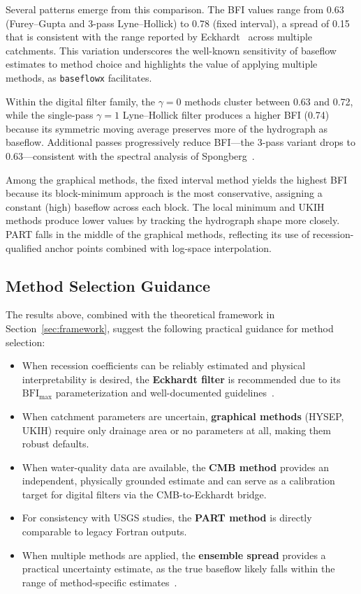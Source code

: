 \documentclass[hydrology,article,submit,pdftex,moreauthors]{Definitions/mdpi}
\begin{document}
Several patterns emerge from this comparison. The BFI values range from 0.63 (Furey--Gupta and 3-pass Lyne--Hollick) to 0.78 (fixed interval), a spread of 0.15 that is consistent with the range reported by Eckhardt~\cite{Eckhardt2008} across multiple catchments. This variation underscores the well-known sensitivity of baseflow estimates to method choice and highlights the value of applying multiple methods, as \texttt{baseflowx} facilitates.

Within the digital filter family, the $\gamma = 0$ methods cluster between 0.63 and 0.72, while the single-pass $\gamma = 1$ Lyne--Hollick filter produces a higher BFI (0.74) because its symmetric moving average preserves more of the hydrograph as baseflow. Additional passes progressively reduce BFI---the 3-pass variant drops to 0.63---consistent with the spectral analysis of Spongberg~\cite{Spongberg2000}.

Among the graphical methods, the fixed interval method yields the highest BFI because its block-minimum approach is the most conservative, assigning a constant (high) baseflow across each block. The local minimum and UKIH methods produce lower values by tracking the hydrograph shape more closely. PART falls in the middle of the graphical methods, reflecting its use of recession-qualified anchor points combined with log-space interpolation.

\subsection{Method Selection Guidance}
\label{sec:method_guidance}

The results above, combined with the theoretical framework in Section~\ref{sec:framework}, suggest the following practical guidance for method selection:

\begin{itemize}[nosep]
\item When recession coefficients can be reliably estimated and physical interpretability is desired, the \textbf{Eckhardt filter} is recommended due to its $\mathrm{BFI_{max}}$ parameterization and well-documented guidelines~\cite{Eckhardt2005,Collischonn2013}.
\item When catchment parameters are uncertain, \textbf{graphical methods} (HYSEP, UKIH) require only drainage area or no parameters at all, making them robust defaults.
\item When water-quality data are available, the \textbf{CMB method} provides an independent, physically grounded estimate and can serve as a calibration target for digital filters via the CMB-to-Eckhardt bridge.
\item For consistency with USGS studies, the \textbf{PART method} is directly comparable to legacy Fortran outputs.
\item When multiple methods are applied, the \textbf{ensemble spread} provides a practical uncertainty estimate, as the true baseflow likely falls within the range of method-specific estimates~\cite{Eckhardt2008}.
\end{itemize}
\end{document}
